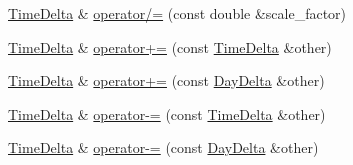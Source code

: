 \begin{DoxyCompactItemize}
\item 
\hyperlink{structTimeDelta}{\-Time\-Delta} \& \hyperlink{structTimeDelta_ae514c2f5fa4266b53bb0220b89e50e54}{operator/=} (const double \&scale\-\_\-factor)
\item 
\hyperlink{structTimeDelta}{\-Time\-Delta} \& \hyperlink{structTimeDelta_ae8d415b1d359e1f6c6a68ee3c44ea21e}{operator+=} (const \hyperlink{structTimeDelta}{\-Time\-Delta} \&other)
\item 
\hyperlink{structTimeDelta}{\-Time\-Delta} \& \hyperlink{structTimeDelta_acf4db7ce2e954d9a706f3e85cd805e42}{operator+=} (const \hyperlink{structDayDelta}{\-Day\-Delta} \&other)
\item 
\hyperlink{structTimeDelta}{\-Time\-Delta} \& \hyperlink{structTimeDelta_adcacf2fa162c98c9a8c7278f0e32ce56}{operator-\/=} (const \hyperlink{structTimeDelta}{\-Time\-Delta} \&other)
\item 
\hyperlink{structTimeDelta}{\-Time\-Delta} \& \hyperlink{structTimeDelta_a8a8d2796e13a24266d46c54873d57eb2}{operator-\/=} (const \hyperlink{structDayDelta}{\-Day\-Delta} \&other)
\end{DoxyCompactItemize}
